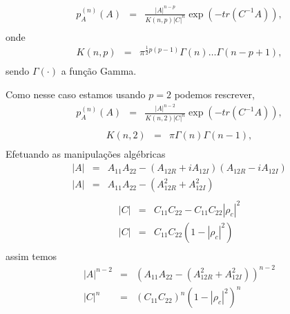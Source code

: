 \documentclass[10pt,a4paper]{article}
\begin{document}
\begin{equation}\label{sec1eqn32}
\begin{array}{ccc}
	p_A^{(n)}(A)&=&\frac{|A|^{n-p}}{K(n,p)|C|^n} \exp(-tr(C^{-1}A)), \\
\end{array}
\end{equation}
onde
\begin{equation}\label{sec1eqn33}
\begin{array}{ccc}
	K(n,p)&=&\pi^{\frac{1}{2}p(p-1)}\Gamma(n)\dots\Gamma(n-p+1), \\
\end{array}
\end{equation}
sendo $\Gamma(\cdot)$ a função Gamma.

Como nesse caso estamos usando $p=2$ podemos rescrever,
\begin{equation}\label{sec1eqn34}
\begin{array}{ccc}
	p_A^{(n)}(A)&=&\frac{|A|^{n-2}}{K(n,2)|C|^n} \exp(-tr(C^{-1}A)), \\
\end{array}
\end{equation}
\begin{equation}\label{sec1eqn35}
\begin{array}{ccc}
	K(n,2)&=&\pi\Gamma(n)\Gamma(n-1), \\
\end{array}
\end{equation}
Efetuando as manipulações algébricas
\begin{equation}\label{sec1eqn36}
\begin{array}{ccc}
	\left|A\right|&=&A_{11}A_{22}-(A_{12R}+iA_{12I})(A_{12R}-iA_{12I})\\
	\left|A\right|&=&A_{11}A_{22}-(A_{12R}^2+A_{12I}^2)\\
\end{array}
\end{equation}
\begin{equation}\label{sec1eqn37}
\begin{array}{ccc}
	\left|C\right|&=&C_{11}C_{22}-C_{11}C_{22}\left|\rho_c\right|^2\\
	\left|C\right|&=&C_{11}C_{22}(1-\left|\rho_c\right|^2)\\
\end{array}
\end{equation}
assim temos
\begin{equation}\label{sec1eqn38}
\begin{array}{ccc}
	\left|A\right|^{n-2}&=&(A_{11}A_{22}-(A_{12R}^2+A_{12I}^2))^{n-2}\\
	\left|C\right|^{n}&=&(C_{11}C_{22})^{n}(1-\left|\rho_c\right|^2)^{n}\\
\end{array}
\end{equation}
\end{document}
